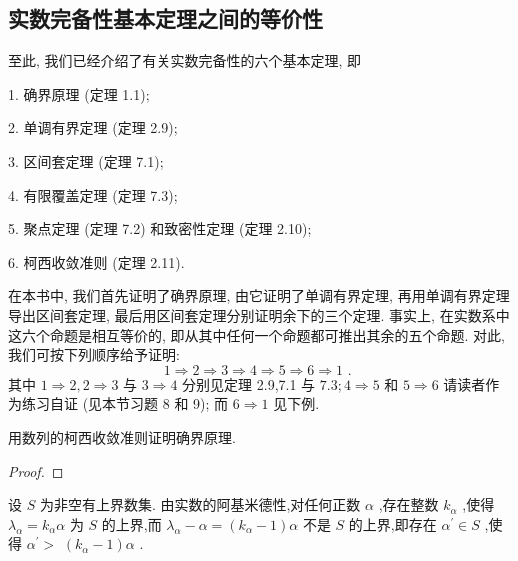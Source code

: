 \subsection{实数完备性基本定理之间的等价性}

至此, 我们已经介绍了有关实数完备性的六个基本定理, 即

1. 确界原理 (定理 1.1);

2. 单调有界定理 (定理 2.9);

3. 区间套定理 (定理 7.1);

4. 有限覆盖定理 (定理 7.3);

5. 聚点定理 (定理 7.2) 和致密性定理 (定理 2.10);

6. 柯西收敛准则 (定理 2.11).

在本书中, 我们首先证明了确界原理, 由它证明了单调有界定理, 再用单调有界定理导出区间套定理, 最后用区间套定理分别证明余下的三个定理. 事实上, 在实数系中这六个命题是相互等价的, 即从其中任何一个命题都可推出其余的五个命题. 对此, 我们可按下列顺序给予证明:
\[
1 \Rightarrow  2 \Rightarrow  3 \Rightarrow  4 \Rightarrow  5 \Rightarrow  6 \Rightarrow  1\text{ . }
\]
其中 \(1 \Rightarrow  2,2 \Rightarrow  3\) 与 \(3 \Rightarrow  4\) 分别见定理 2.9,7.1 与 \({7.3};4 \Rightarrow  5\) 和 \(5 \Rightarrow  6\) 请读者作为练习自证 (见本节习题 8 和 9); 而 \(6 \Rightarrow  1\) 见下例.

\begin{example}

\end{example}
用数列的柯西收敛准则证明确界原理.

\begin{proof}

\end{proof}
设 \(S\) 为非空有上界数集. 由实数的阿基米德性,对任何正数 \(\alpha\) ,存在整数 \({k}_{\alpha }\) ,使得 \({\lambda }_{\alpha } = {k}_{\alpha }\alpha\) 为 \(S\) 的上界,而 \({\lambda }_{\alpha } - \alpha  = \left( {{k}_{\alpha } - 1}\right) \alpha\) 不是 \(S\) 的上界,即存在 \({\alpha }^{\prime } \in  S\) ,使得 \({\alpha }^{\prime } >\)  \(\left( {{k}_{\alpha } - 1}\right) \alpha\) .

